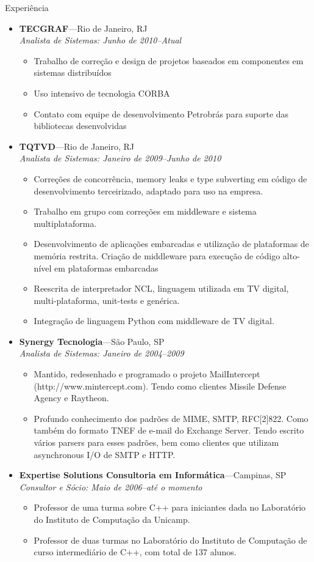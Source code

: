\documentclass[10pt,oneside]{article}
\newenvironment{ressection}[1]{
	\vspace{4pt}
	{\fontfamily{phv}\selectfont\Large#1}
	\begin{itemize}
	\vspace{3pt}
}{
	\end{itemize}
}
\newcommand{\ressubitem}[1]{
	\vspace{-1pt}
	\item \begin{flushleft} #1 \end{flushleft}
}
\newcommand{\resbigitem}[3]{
	\vspace{-5pt}
	\item
	\textbf{#1}---#2 \\
	\textit{#3}
}
\newenvironment{ressubsec}[3]{
	\resbigitem{#1}{#2}{#3}
	\vspace{-2pt}
	\begin{itemize}
}{
	\end{itemize}
}
\begin{document}
\begin{ressection}{Experi\^encia}

  \begin{ressubsec}{TECGRAF}{Rio de Janeiro, RJ}{Analista de Sistemas: Junho de 2010--Atual}
    \ressubitem{Trabalho de correção e design de projetos baseados em componentes em sistemas distribuídos}
    \ressubitem{Uso intensivo de tecnologia CORBA}
    \ressubitem{Contato com equipe de desenvolvimento Petrobrás para suporte das bibliotecas desenvolvidas}
  \end{ressubsec}

	\begin{ressubsec}{TQTVD}{Rio de Janeiro, RJ}{Analista de Sistemas: Janeiro de 2009--Junho de 2010}
      \ressubitem{Correções de concorrência, memory leaks e type subverting em código de desenvolvimento
        terceirizado, adaptado para uso na empresa.}
      \ressubitem{Trabalho em grupo com correções em middleware e sistema multiplataforma.}
      \ressubitem{Desenvolvimento de aplicações embarcadas e utilização de plataformas de memória restrita.
        Criação de middleware para execução de código alto-nível em plataformas embarcadas}
      \ressubitem{Reescrita de interpretador NCL, linguagem utilizada em TV digital, multi-plataforma,
        unit-tests e genérica.}
      \ressubitem{Integração de linguagem Python com middleware de TV digital.}
	\end{ressubsec}

	\begin{ressubsec}{Synergy Tecnologia}{S\~ao Paulo, SP}{Analista de Sistemas: Janeiro de 2004--2009}
		\ressubitem{Mantido, redesenhado e programado o projeto MailIntercept (http://www.mintercept.com). Tendo como clientes Missile Defense Agency e Raytheon.}
		\ressubitem{Profundo conhecimento dos padr\~oes de MIME, SMTP, RFC[2]822. Como tamb\'em do formato TNEF de e-mail do Exchange Server.
		  Tendo escrito v\'arios parsers para esses padr\~oes, bem como clientes que utilizam asynchronous I/O de SMTP e HTTP.}
	\end{ressubsec}

	\begin{ressubsec}{Expertise Solutions Consultoria em Inform\'atica}{Campinas, SP}{Consultor e Sócio: Maio de 2006--at\'e o momento}
		\ressubitem{Professor de uma turma sobre C++ para iniciantes dada no Laborat\'orio do Instituto de
		Computa\c{c}\~ao da Unicamp.}
		\ressubitem{Professor de duas turmas no Laboratório do Instituto de Computa\c{c}\~ao de curso intermediário de C++, com total de 137 alunos.}
	\end{ressubsec}


\end{ressection}
\end{document}
